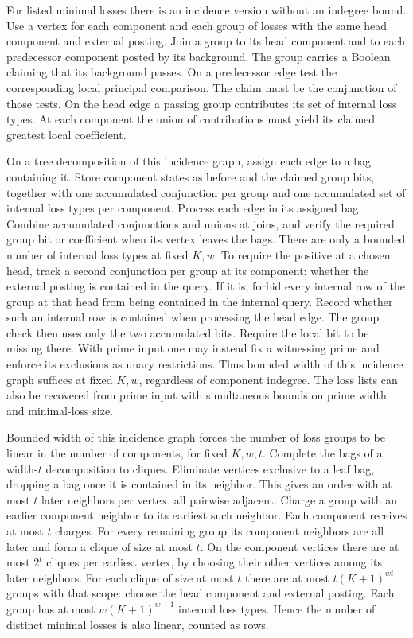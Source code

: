 For listed minimal losses there is an incidence
version without an indegree bound. Use a vertex
for each component and each group of losses with
the same head component and external posting.
Join a group to its head component and to each
predecessor component posted by its background.
The group carries a Boolean claiming that its
background passes. On a predecessor edge test
the corresponding local principal comparison.
The claim must be the conjunction of those tests.
On the head edge a passing group contributes its
set of internal loss types. At each component
the union of contributions must yield its claimed
greatest local coefficient.

On a tree decomposition of this incidence graph,
assign each edge to a bag containing it. Store
component states as before and the claimed group
bits, together with one accumulated conjunction
per group and one accumulated set of internal
loss types per component. Process each edge in
its assigned bag. Combine accumulated conjunctions
and unions at joins, and verify the required group
bit or coefficient when its vertex leaves the
bags. There are only a bounded number of internal
loss types at fixed $K,w$. To require the positive
at a chosen head, track a second conjunction
per group at its component: whether the external
posting is contained in the query. If it is,
forbid every internal row of the group at that
head from being contained in the internal query.
Record whether such an internal row is contained
when processing the head edge. The group check
then uses only the two accumulated bits.
Require the local bit to be missing there. With
prime input one may instead fix a witnessing prime
and enforce its exclusions as unary restrictions.
Thus bounded width of this incidence
graph suffices at fixed $K,w$, regardless of
component indegree. The loss lists can also be
recovered from prime input with simultaneous
bounds on prime width and minimal-loss size.

Bounded width of this incidence graph forces the
number of loss groups to be linear in the number
of components, for fixed $K,w,t$. Complete the bags
of a width-$t$ decomposition to cliques. Eliminate
vertices exclusive to a leaf bag, dropping a bag
once it is contained in its neighbor. This gives
an order with at most $t$ later neighbors per
vertex, all pairwise adjacent. Charge a group with
an earlier component neighbor to its earliest such
neighbor. Each component receives at most $t$
charges. For every remaining group its component
neighbors are all later and form a clique of size
at most $t$. On the component vertices there are
at most $2^t$ cliques per earliest vertex, by
choosing their other vertices among its later
neighbors. For each clique of size at most $t$
there are at most $t(K+1)^{wt}$ groups with that
scope: choose the head component and external
posting. Each group has at most $w(K+1)^{w-1}$
internal loss types. Hence the number of distinct
minimal losses is also linear, counted as rows.

